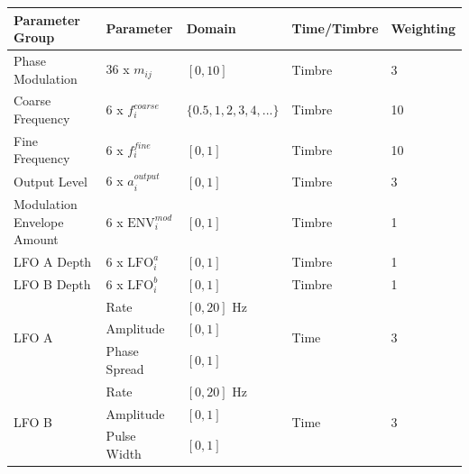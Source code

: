 \documentclass[11pt, oneside]{report}   	%
\begin{document}
\def\arraystretch{1.5}
\begin{table}[]
	\hspace{-2em}
	\begin{tabular}{|l|l|l|l|l|}
		\hline
		\textbf{Parameter Group}                	 & \textbf{Parameter}     & \textbf{Domain}            & \textbf{Time/Timbre} & \textbf{Weighting} \\ \hline
		Phase Modulation         						& 36 x $m_{ij}$               & $[0, 10]$                  		& Timbre                	& 3									\\ \hline
		Coarse Frequency                            	& 6 x $f_{i}^{coarse}$     & $\{0.5, 1, 2, 3, 4, ...\}$ & Timbre                	& 10									  \\ \hline
		Fine Frequency                                 	   & 6 x $f_{i}^{fine}$         & $[0, 1]$                   		& Timbre                	& 10									  \\ \hline
		Output Level                                  		& 6 x $a_{i}^{output}$     & $[0, 1]$                   	  & Timbre                	& 3								    	\\ \hline
Modulation Envelope Amount                       & 6 x $\mathrm{ENV}_{i}^{mod}$   & $[0, 1]$                   	     & Timbre                  & 1		  \\ \hline
		LFO A Depth                                    		& 6 x $\mathrm{LFO}_{i}^{a}$         & $[0, 1]$                   	   & Timbre                  & 1				\\ \hline
		LFO B Depth                                    		& 6 x $\mathrm{LFO}_{i}^{b}$        & $[0, 1]$                   	   & Timbre                  & 1				\\ \hline
		\multirow{3}{*}{LFO A}      					& Rate                    		& $[0, 20]$ Hz               	 & \multirow{3}{*}{Time}& \multirow{3}{*}{3} \\
																	  & Amplitude               	& $[0, 1]$                   		&                      				& \\
																	  & Phase Spread         	& $[0, 1]$                   		&                       			&\\ \hline
		\multirow{3}{*}{LFO B}      					& Rate                    		& $[0, 20]$ Hz               	& \multirow{3}{*}{Time}& \multirow{3}{*}{3} \\
																	  & Amplitude               	& $[0, 1]$                   		&                       			&\\
																	  & Pulse Width                & $[0, 1]$                   		&                       			&\\ \hline

\end{tabular}
\end{table}
\end{document}
